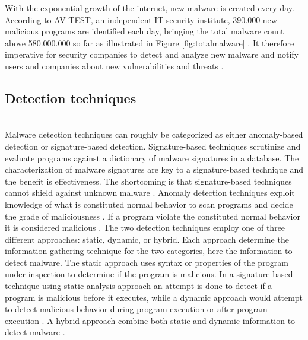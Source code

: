 \documentclass[12pt]{article} %
\begin{document}
With the exponential growth of the internet, new malware is created every day. According to AV-TEST, an independent IT-security institute, 390.000 new malicious programs are identified each day, bringing the total malware count above 580.000.000 so far as illustrated in Figure \ref{fig:totalmalware} \cite{avtest}. It therefore imperative for security companies to detect and analyze new malware and notify users and companies about new vulnerabilities and threats \cite{kosmidis2017machine}.  
\\
\subsection{Detection techniques}
\\ 
Malware detection techniques can roughly be categorized as either anomaly-based detection or signature-based detection. Signature-based techniques scrutinize and evaluate programs against a dictionary of malware signatures in a database. The characterization of malware signatures are key to a signature-based technique and the benefit is effectiveness. The shortcoming is that signature-based techniques cannot shield against unknown malware \cite{Asurveyonmalware, idika2007survey}. Anomaly detection techniques exploit knowledge of what is constituted normal behavior to scan programs and decide the grade of maliciousness \cite{idika2007survey}. If a program violate the constituted normal behavior it is considered malicious \cite{idika2007survey}. 
The two detection techniques employ one of three different approaches: static,  dynamic, or hybrid. Each approach determine the information-gathering technique for the two categories, here the information to detect malware. The static approach uses syntax or properties of the program under inspection to determine if the program is malicious. In  a signature-based technique using static-analysis approach an attempt is done to detect if a program is malicious before it executes, while a dynamic approach would attempt to detect malicious behavior during program execution or after program execution \cite{idika2007survey}. A hybrid approach combine both static and dynamic information to detect malware \cite{idika2007survey}.
\\
\end{document}
